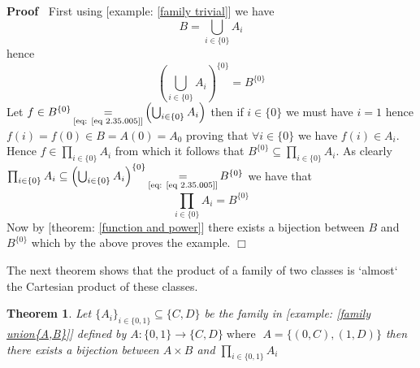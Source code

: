 \documentclass{book}
\newcommand{\equallim}{\mathop{=}\limits}
\newcommand{\tmop}[1]{\ensuremath{\operatorname{#1}}}
\newenvironment{proof}{\noindent\textbf{Proof\ }}{\hspace*{\fill}$\Box$\medskip}
\newtheorem{theorem}{Theorem}
\begin{document}
\begin{proof}
  First using [example: \ref{family trivial}] we have
  \begin{equation}
    \label{eq 2.34.005} B = \bigcup_{i \in \{ 0 \}} A_i
  \end{equation}
  hence
  \begin{equation}
    \label{eq 2.35.005} \left( \bigcup_{i \in \{ 0 \}} A_i \right)^{\{ 0 \}} =
    B^{\{ 0 \}}
  \end{equation}
  Let $f \in B^{\{ 0 \}} \equallim_{\text{[eq: \ref{eq 2.35.005}]}} \left(
  \bigcup_{i \in \{ 0 \}} A_i \right)$ then if $i \in \{ 0 \}$ we must have $i
  = 1$ hence $f (i) = f (0) \in B = A (0) = A_0$ proving that $\forall i \in
  \{ 0 \}$ we have $f (i) \in A_i$. Hence $f \in \prod_{i \in \{ 0 \}} A_i$
  from which it follows that $B^{\{ 0 \}} \subseteq \prod_{i \in \{ 0 \}}
  A_i$. As clearly $\prod_{i \in \{ 0 \}} A_i \subseteq \left( \bigcup_{i \in
  \{ 0 \}} A_i \right)^{\{ 0 \}} \equallim_{\text{[eq: \ref{eq 2.35.005}]}}
  B^{\{ 0 \}}$ we have that
  \[ \prod_{i \in \{ 0 \}} A_i = B^{\{ 0 \}} \]
  Now by [theorem: \ref{function and power}] there exists a bijection between
  $B$ and $B^{\{ 0 \}}$ which by the above proves the example.
\end{proof}

The next theorem shows that the product of a family of two classes is `almost`
the Cartesian product of these classes.

\begin{theorem}
  \label{product of family with two classes}Let $\{ A_i \}_{i \in \{ 0, 1 \}}
  \subseteq \{ C, D \}$ be the family in [example: \ref{family union{A,B}}]
  defined by $A : \{ 0, 1 \} \rightarrow \{ C, D \} \tmop{where}$ $A = \{ (0,
  C), (1, D) \}$ then there exists a bijection between $A \times B$ and
  $\prod_{i \in \{ 0, 1 \}} A_i$
\end{theorem}
\end{document}
